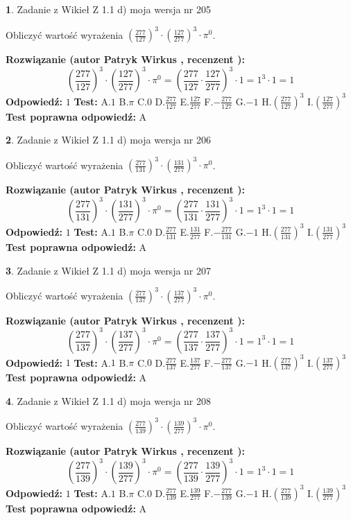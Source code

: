\documentclass[12pt, a4paper]{article}
\theoremstyle{definition} %
\newtheorem{zad}{}
\newcommand{\zadStart}[1]{\begin{zad}#1\newline}
\newcommand{\zadStop}{\end{zad}}
\newcommand{\rozwStart}[2]{\noindent \textbf{Rozwiązanie (autor #1 , recenzent #2): }\newline}
\newcommand{\rozwStop}{\newline}
\newcommand{\odpStart}{\noindent \textbf{Odpowiedź:}\newline}
\newcommand{\odpStop}{\newline}
\newcommand{\testStart}{\noindent \textbf{Test:}\newline}
\newcommand{\testStop}{\newline}
\newcommand{\kluczStart}{\noindent \textbf{Test poprawna odpowiedź:}\newline}
\newcommand{\kluczStop}{\newline}
\begin{document}
\zadStart{Zadanie z Wikieł Z 1.1 d) moja wersja nr 205}

Obliczyć wartość wyrażenia $(\frac{277}{127})^{3} \cdot (\frac{127}{277})^{3} \cdot \pi^{0}$.
\zadStop
\rozwStart{Patryk Wirkus}{}
$$(\frac{277}{127})^{3} \cdot (\frac{127}{277})^{3} \cdot \pi^{0} = (\frac{277}{127} \cdot \frac{127}{277})^{3} \cdot 1 = 1^{3} \cdot 1 = 1$$
\rozwStop
\odpStart
$1$
\odpStop
\testStart
A.$1$ B.$\pi$ C.$0$ D.$\frac{277}{127}$ E.$\frac{127}{277}$
F.$-\frac{277}{127}$ G.$-1$
H.$(\frac{277}{127})^{3}$
I.$(\frac{127}{277})^{3}$
\testStop
\kluczStart
A
\kluczStop



\zadStart{Zadanie z Wikieł Z 1.1 d) moja wersja nr 206}

Obliczyć wartość wyrażenia $(\frac{277}{131})^{3} \cdot (\frac{131}{277})^{3} \cdot \pi^{0}$.
\zadStop
\rozwStart{Patryk Wirkus}{}
$$(\frac{277}{131})^{3} \cdot (\frac{131}{277})^{3} \cdot \pi^{0} = (\frac{277}{131} \cdot \frac{131}{277})^{3} \cdot 1 = 1^{3} \cdot 1 = 1$$
\rozwStop
\odpStart
$1$
\odpStop
\testStart
A.$1$ B.$\pi$ C.$0$ D.$\frac{277}{131}$ E.$\frac{131}{277}$
F.$-\frac{277}{131}$ G.$-1$
H.$(\frac{277}{131})^{3}$
I.$(\frac{131}{277})^{3}$
\testStop
\kluczStart
A
\kluczStop



\zadStart{Zadanie z Wikieł Z 1.1 d) moja wersja nr 207}

Obliczyć wartość wyrażenia $(\frac{277}{137})^{3} \cdot (\frac{137}{277})^{3} \cdot \pi^{0}$.
\zadStop
\rozwStart{Patryk Wirkus}{}
$$(\frac{277}{137})^{3} \cdot (\frac{137}{277})^{3} \cdot \pi^{0} = (\frac{277}{137} \cdot \frac{137}{277})^{3} \cdot 1 = 1^{3} \cdot 1 = 1$$
\rozwStop
\odpStart
$1$
\odpStop
\testStart
A.$1$ B.$\pi$ C.$0$ D.$\frac{277}{137}$ E.$\frac{137}{277}$
F.$-\frac{277}{137}$ G.$-1$
H.$(\frac{277}{137})^{3}$
I.$(\frac{137}{277})^{3}$
\testStop
\kluczStart
A
\kluczStop



\zadStart{Zadanie z Wikieł Z 1.1 d) moja wersja nr 208}

Obliczyć wartość wyrażenia $(\frac{277}{139})^{3} \cdot (\frac{139}{277})^{3} \cdot \pi^{0}$.
\zadStop
\rozwStart{Patryk Wirkus}{}
$$(\frac{277}{139})^{3} \cdot (\frac{139}{277})^{3} \cdot \pi^{0} = (\frac{277}{139} \cdot \frac{139}{277})^{3} \cdot 1 = 1^{3} \cdot 1 = 1$$
\rozwStop
\odpStart
$1$
\odpStop
\testStart
A.$1$ B.$\pi$ C.$0$ D.$\frac{277}{139}$ E.$\frac{139}{277}$
F.$-\frac{277}{139}$ G.$-1$
H.$(\frac{277}{139})^{3}$
I.$(\frac{139}{277})^{3}$
\testStop
\kluczStart
A
\kluczStop
\end{document}
